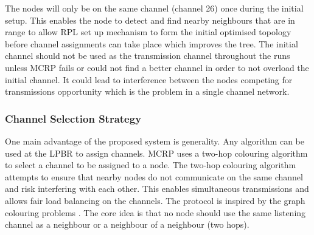 The nodes will only be on the same channel (channel 26) once during the initial setup.
This enables the node to detect and find nearby neighbours that are in range to allow RPL set up mechanism to form the initial optimised topology before channel assignments can take place which improves the tree.
The initial channel should not be used as the transmission channel throughout the runs unless MCRP fails or could not find a better channel in order to not overload the initial channel.
It could lead to interference between the nodes competing for transmissions opportunity which is the problem in a single channel network. 

\subsubsection{Channel Selection Strategy}
One main advantage of the proposed system is generality. Any algorithm can be used at the LPBR to assign channels. MCRP uses a two-hop colouring algorithm to select a channel to be assigned to a node.
The two-hop colouring algorithm attempts to ensure that nearby nodes do not communicate on the same channel and risk interfering with each other. This enables simultaneous transmissions and allows fair load balancing on the channels. The protocol is inspired by the graph colouring problems \cite{graphColouring}. The core idea is that no node should use the same listening channel as a neighbour or a neighbour of a neighbour (two hops).


